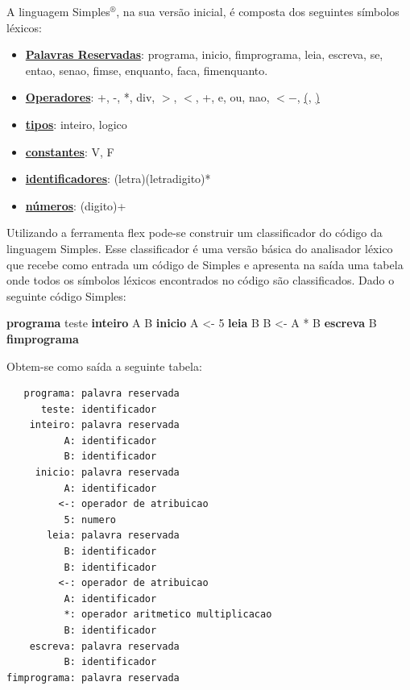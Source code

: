 \documentclass[
  brazilian,
  letterpaper,
]{book}
\newenvironment{Shaded}{\begin{snugshade}}{\end{snugshade}}
\newcommand{\DecValTok}[1]{\textcolor[rgb]{0.68,0.00,0.00}{#1}}
\newcommand{\KeywordTok}[1]{\textcolor[rgb]{0.00,0.23,0.31}{\textbf{#1}}}
\newcommand{\NormalTok}[1]{\textcolor[rgb]{0.00,0.23,0.31}{#1}}
\theoremstyle{plain}
\theoremstyle{definition}
\theoremstyle{remark}
\begin{document}
A linguagem Simples\(^\circledR\), na sua versão inicial, é composta dos
seguintes símbolos léxicos:

\begin{itemize}
\item
  \ul{\textbf{Palavras Reservadas}}: programa, inicio, fimprograma,
  leia, escreva, se, entao, senao, fimse, enquanto, faca, fimenquanto.
\item
  \ul{\textbf{Operadores}}: +, -, *, div, \(>\), \(<\), +, e, ou, nao,
  \ul{$<$$-$}, \ul{(}, \ul{)}
\item
  \ul{\textbf{tipos}}: inteiro, logico
\item
  \ul{\textbf{constantes}}: V, F
\item
  \ul{\textbf{identificadores}}: (letra)(letradigito)*
\item
  \ul{\textbf{números}}: (digito)+
\end{itemize}

Utilizando a ferramenta flex pode-se construir um classificador do
código da linguagem Simples. Esse classificador é uma versão básica do
analisador léxico que recebe como entrada um código de Simples e
apresenta na saída uma tabela onde todos os símbolos léxicos encontrados
no código são classificados. Dado o seguinte código Simples:

\begin{Shaded}
\begin{Highlighting}[]
\KeywordTok{programa}\NormalTok{ teste}
  \KeywordTok{inteiro}\NormalTok{ A B}
\KeywordTok{inicio}
\NormalTok{  A \textless{}{-} }\DecValTok{5}
  \KeywordTok{leia}\NormalTok{ B}
\NormalTok{  B \textless{}{-} A * B}
  \KeywordTok{escreva}\NormalTok{ B}
\KeywordTok{fimprograma}
\end{Highlighting}
\end{Shaded}

Obtem-se como saída a seguinte tabela:

\begin{verbatim}
   programa: palavra reservada
      teste: identificador
    inteiro: palavra reservada
          A: identificador
          B: identificador
     inicio: palavra reservada
          A: identificador
         <-: operador de atribuicao
          5: numero
       leia: palavra reservada
          B: identificador
          B: identificador
         <-: operador de atribuicao
          A: identificador
          *: operador aritmetico multiplicacao
          B: identificador
    escreva: palavra reservada
          B: identificador
fimprograma: palavra reservada
\end{verbatim}
\end{document}
